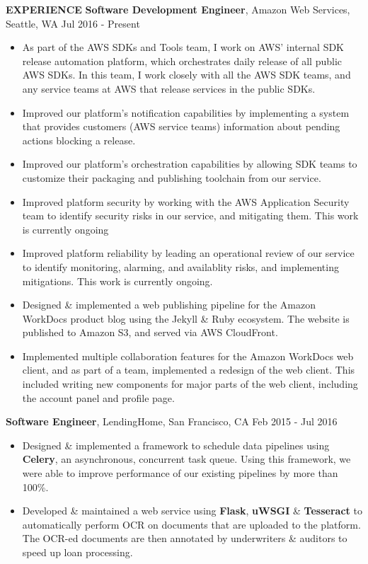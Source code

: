 \documentclass[10pt, letterpaper]{article}
\begin{document}
\textbf{EXPERIENCE}
\smallskip
\newline
\textbf{Software Development Engineer}, Amazon Web Services, Seattle, WA \hfill Jul 2016 - Present
\begin{itemize}
\item As part of the AWS SDKs and Tools team, I work on AWS' internal SDK release automation platform, which orchestrates daily release of all public AWS SDKs. In this team, I work closely with all the AWS SDK teams, and any service teams at AWS that release services in the public SDKs.
\item Improved our platform's notification capabilities by implementing a system that provides customers (AWS service teams) information about pending actions blocking a release.
\item Improved our platform's orchestration capabilities by allowing SDK teams to customize their packaging and publishing toolchain from our service.
\item Improved platform security by working with the AWS Application Security team to identify security risks in our service, and mitigating them. This work is currently ongoing
\item Improved platform reliability by leading an operational review of our service to identify monitoring, alarming, and availablity risks, and implementing mitigations. This work is currently ongoing.
\item Designed \& implemented a web publishing pipeline for the Amazon WorkDocs product blog using the Jekyll \& Ruby ecosystem. The website is published to Amazon S3, and served via AWS CloudFront.
\item Implemented multiple collaboration features for the Amazon WorkDocs web client, and as part of a team, implemented a redesign of the web client. This included writing new components for major parts of the web client, including the account panel and profile page.
\end{itemize}
\textbf{Software Engineer}, LendingHome, San Francisco, CA \hfill Feb 2015 - Jul 2016
\begin{itemize}
\item Designed \& implemented a framework to schedule data pipelines using \textbf{Celery}, an asynchronous, concurrent task queue. Using this framework, we were able to improve performance of our existing pipelines by more than 100\%.
\item Developed \& maintained a web service using \textbf{Flask}, \textbf{uWSGI} \& \textbf{Tesseract} to automatically perform OCR on documents that are uploaded to the platform. The OCR-ed documents are then annotated by underwriters \& auditors to speed up loan processing.
\end{itemize}
\end{document}
